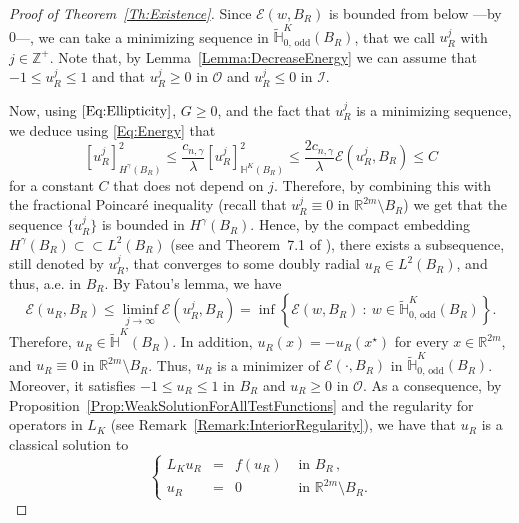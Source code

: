 \documentclass[12pt,reqno]{amsart}
\theoremstyle{definition}
\theoremstyle{remark}
\newcommand{\con}[1]{\mathbb{#1}}
\newcommand{\R}{\con{R}} %
\newcommand{\Z}{\con{Z}} %
\renewcommand{\H}{\con{H}}
\newcommand{\ecal}{\mathcal{E}}
\newcommand{\ical}{\mathcal{I}}
\newcommand{\ocal}{\mathcal{O}}
\newcommand{\s}{\gamma}
\newcommand{\setcond}[2]{\left \{ #1 \ : \ #2  \right \}}
\newcommand\beqc[1]{\left\{\begin{array}{#1}}
\newcommand\eeqc{\end{array} \right.}
\def\PDEsystem{rcll}
\numberwithin{equation}{section}
\begin{document}
\begin{proof}[Proof of Theorem~\ref{Th:Existence}]
	Since $\ecal(w,B_R)$ is bounded from below ---by $0$---, we can take a minimizing sequence in $\widetilde{\H}^K_{0, \,\mathrm{odd}}(B_R)$, that we call $u_R^j$ with $j\in \Z^+$. Note that, by Lemma~\ref{Lemma:DecreaseEnergy} we can assume that $-1 \leq u_R^j \leq 1$ and that $u_R^j \geq 0$ in $\ocal$ and  $u_R^j \leq 0$ in $\ical$. 
	
	Now, using $\eqref{Eq:Ellipticity}$, $G\geq 0$, and the fact that $u_R^j$ is a minimizing sequence, we deduce using \eqref{Eq:Energy} that 
	$$
	[u_R^j]^2_{H^\s(B_R)} \leq \dfrac{c_{n,\s}}{\lambda}  [u_R^j]^2_{\H^K(B_R)}\leq \dfrac{2 c_{n,\s}}{\lambda}\ecal(u_R^j,B_R) \leq C
	$$
	for a constant $C$ that does not depend on $j$. Therefore, by combining this with the fractional Poincaré inequality (recall that $u_R^j \equiv 0$ in $\R^{2m}\setminus B_R$) we get that the sequence $\{u_R^j\}$ is bounded in $H^\s(B_R)$. Hence, by the compact embedding $H^\s(B_R) \subset \subset L^2(B_R)$ (see \cite{Adams} and Theorem~7.1 of \cite{HitchhikerGuide}), there exists a subsequence, still denoted by $u_R^j$,  that converges to some doubly radial $u_R \in L^2(B_R)$, and thus, a.e. in $B_R$. By Fatou's lemma, we have
	$$
	\ecal(u_R, B_R)
	\leq \liminf_{j\to \infty} \ecal(u_R^j, B_R) = \inf \setcond{\ecal(w, B_R)}{w \in \widetilde{\H}^K_{0, \,\mathrm{odd}}(B_R)}.
	$$
	Therefore, $u_R \in \widetilde{\H}^K(B_R)$. In addition, $u_R(x) = - u_R(x^\star)$ for every $x\in \R^{2m}$, and $u_R \equiv 0 $ in $\R^{2m} \setminus B_R$. Thus, $u_R$ is a minimizer of $\ecal(\cdot, B_R)$ in $\widetilde{\H}^K_{0, \,\mathrm{odd}}(B_R)$. Moreover, it satisfies $-1\leq u_R \leq 1$ in $B_R$ and $u_R\geq 0$ in $\ocal$. As a consequence, by Proposition~\ref{Prop:WeakSolutionForAllTestFunctions} and the regularity for operators in $L_K$ (see Remark~\ref{Remark:InteriorRegularity}), we have that $u_R$ is a classical solution to
	$$
	 \beqc{\PDEsystem}
	 L_K  u_R &=& f(u_R) & \textrm{ in } B_R\,,\\
	 u_R &=& 0 & \textrm{ in }\R^{2m} \setminus B_R.
	 \eeqc
	$$	
	

\end{proof}
\end{document}
